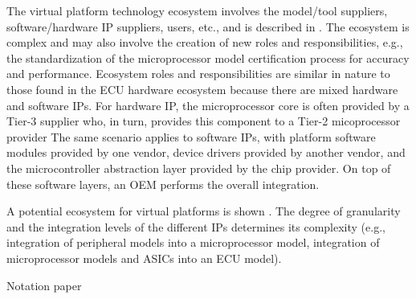 The virtual platform technology ecosystem involves the model/tool suppliers, software/hardware IP suppliers, users, etc., and is described in \cite{Knauss2014d}.
The ecosystem is complex and may also involve the creation of new roles and responsibilities,
e.g., the standardization of the microprocessor model certification process  for accuracy and performance.
Ecosystem roles and responsibilities are similar in nature to those found in the ECU hardware ecosystem because there are mixed hardware and software IPs.
For hardware IP, the microprocessor core is often provided by a Tier-3 supplier who, in turn, provides this component to a Tier-2 micoprocessor provider
The same scenario applies to software IPs, with platform software modules provided by one vendor, device drivers provided by another vendor, and the microcontroller abstraction layer provided by the chip provider.
On top of these software layers, an OEM performs the overall integration.

A potential ecosystem for virtual platforms is shown .
The degree of granularity and the integration levels of the different IPs determines its complexity (e.g., integration of peripheral models into a microprocessor model, integration of microprocessor models and ASICs into an ECU model).

Notation paper \cite{Sjaak Brinkkemper}